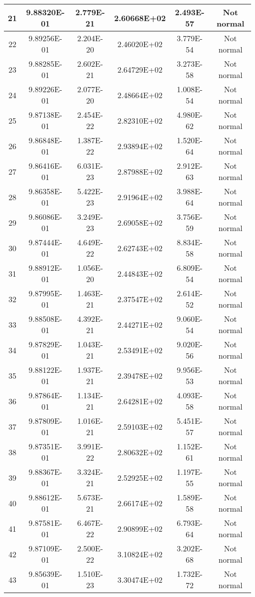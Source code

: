 \begin{table}[h]
\begin{tabular}{|c|c|c|c|c|c|}
		21 & 9.88320E-01 & 2.779E-21 & 2.60668E+02 & 2.493E-57 & Not normal\\\hline
		22 & 9.89256E-01 & 2.204E-20 & 2.46020E+02 & 3.779E-54 & Not normal\\\hline
		23 & 9.88285E-01 & 2.602E-21 & 2.64729E+02 & 3.273E-58 & Not normal\\\hline
		24 & 9.89226E-01 & 2.077E-20 & 2.48664E+02 & 1.008E-54 & Not normal\\\hline
		25 & 9.87138E-01 & 2.454E-22 & 2.82310E+02 & 4.980E-62 & Not normal\\\hline
		26 & 9.86848E-01 & 1.387E-22 & 2.93894E+02 & 1.520E-64 & Not normal\\\hline
		27 & 9.86416E-01 & 6.031E-23 & 2.87988E+02 & 2.912E-63 & Not normal\\\hline
		28 & 9.86358E-01 & 5.422E-23 & 2.91964E+02 & 3.988E-64 & Not normal\\\hline
		29 & 9.86086E-01 & 3.249E-23 & 2.69058E+02 & 3.756E-59 & Not normal\\\hline
		30 & 9.87444E-01 & 4.649E-22 & 2.62743E+02 & 8.834E-58 & Not normal\\\hline
		31 & 9.88912E-01 & 1.056E-20 & 2.44843E+02 & 6.809E-54 & Not normal\\\hline
		32 & 9.87995E-01 & 1.463E-21 & 2.37547E+02 & 2.614E-52 & Not normal\\\hline
		33 & 9.88508E-01 & 4.392E-21 & 2.44271E+02 & 9.060E-54 & Not normal\\\hline
		34 & 9.87829E-01 & 1.043E-21 & 2.53491E+02 & 9.020E-56 & Not normal\\\hline
		35 & 9.88122E-01 & 1.937E-21 & 2.39478E+02 & 9.956E-53 & Not normal\\\hline
		36 & 9.87864E-01 & 1.134E-21 & 2.64281E+02 & 4.093E-58 & Not normal\\\hline
		37 & 9.87809E-01 & 1.016E-21 & 2.59103E+02 & 5.451E-57 & Not normal\\\hline
		38 & 9.87351E-01 & 3.991E-22 & 2.80632E+02 & 1.152E-61 & Not normal\\\hline
		39 & 9.88367E-01 & 3.324E-21 & 2.52925E+02 & 1.197E-55 & Not normal\\\hline
		40 & 9.88612E-01 & 5.673E-21 & 2.66174E+02 & 1.589E-58 & Not normal\\\hline
		41 & 9.87581E-01 & 6.467E-22 & 2.90899E+02 & 6.793E-64 & Not normal\\\hline
		42 & 9.87109E-01 & 2.500E-22 & 3.10824E+02 & 3.202E-68 & Not normal\\\hline
		43 & 9.85639E-01 & 1.510E-23 & 3.30474E+02 & 1.732E-72 & Not normal\\\hline

\end{tabular}
\end{table}
